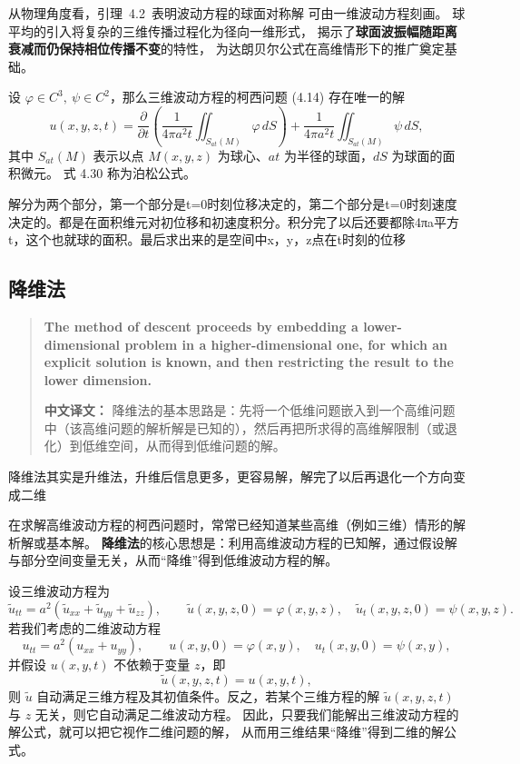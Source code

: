 \begin{solution}
\begin{remark}
从物理角度看，引理~4.2~表明波动方程的球面对称解
可由一维波动方程刻画。
球平均的引入将复杂的三维传播过程化为径向一维形式，
揭示了\textbf{球面波振幅随距离衰减而仍保持相位传播不变}的特性，
为达朗贝尔公式在高维情形下的推广奠定基础。
\end{remark}

\begin{theorem}[泊松公式-三维给t=0时刻条件的解]
设 $\varphi \in C^3,\ \psi \in C^2$，那么三维波动方程的柯西问题 (4.14) 存在唯一的解
\[
u(x,y,z,t)
= \frac{\partial}{\partial t}
\left(
\frac{1}{4\pi a^2 t}
\iint_{S_{at}(M)} \varphi\, dS
\right)
+ \frac{1}{4\pi a^2 t}
\iint_{S_{at}(M)} \psi\, dS,
\tag{4.30}
\]
其中 $S_{at}(M)$ 表示以点 $M(x,y,z)$ 为球心、$at$ 为半径的球面，$dS$ 为球面的面积微元。
式 {4.30} 称为泊松公式。
\end{theorem}

\begin{remark}
    解分为两个部分，第一个部分是t=0时刻位移决定的，第二个部分是t=0时刻速度决定的。都是在面积维元对初位移和初速度积分。积分完了以后还要都除4πa平方t，这个也就球的面积。最后求出来的是空间中x，y，z点在t时刻的位移
\end{remark}



\subsection{降维法}
\begin{quotation}
\textbf{The method of descent proceeds by embedding a lower-dimensional problem in a higher-dimensional one, for which an explicit solution is known, and then restricting the result to the lower dimension.}

\medskip
\textbf{中文译文：}  
降维法的基本思路是：先将一个低维问题嵌入到一个高维问题中（该高维问题的解析解是已知的），然后再把所求得的高维解限制（或退化）到低维空间，从而得到低维问题的解。
\end{quotation}
\begin{dxtips}
  降维法其实是升维法，升维后信息更多，更容易解，解完了以后再退化一个方向变成二维  
\end{dxtips}
\begin{remark}[降维法的基本思想]
在求解高维波动方程的柯西问题时，常常已经知道某些高维（例如三维）情形的解析解或基本解。
\textbf{降维法}的核心思想是：利用高维波动方程的已知解，通过假设解与部分空间变量无关，从而“降维”得到低维波动方程的解。

设三维波动方程为
\[
\tilde{u}_{tt}=a^2(\tilde{u}_{xx}+\tilde{u}_{yy}+\tilde{u}_{zz}),\qquad
\tilde{u}(x,y,z,0)=\varphi(x,y,z),\quad
\tilde{u}_t(x,y,z,0)=\psi(x,y,z).
\]
若我们考虑的二维波动方程
\[
u_{tt}=a^2(u_{xx}+u_{yy}),\qquad
u(x,y,0)=\varphi(x,y),\quad
u_t(x,y,0)=\psi(x,y),
\]
并假设 $u(x,y,t)$ 不依赖于变量 $z$，即
\[
\tilde{u}(x,y,z,t)=u(x,y,t),
\]
则 $\tilde{u}$ 自动满足三维方程及其初值条件。反之，若某个三维方程的解 $\tilde{u}(x,y,z,t)$
与 $z$ 无关，则它自动满足二维波动方程。
因此，只要我们能解出三维波动方程的解公式，就可以把它视作二维问题的解，
从而用三维结果“降维”得到二维的解公式。


\end{remark}
\end{solution}
